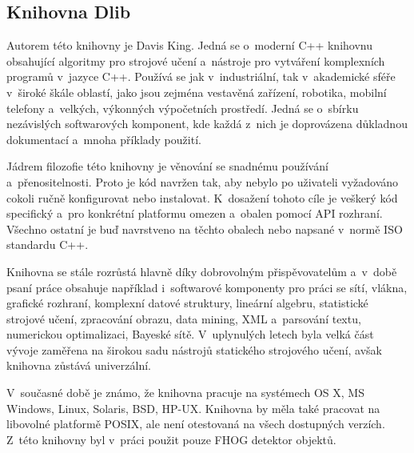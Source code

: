\subsection{Knihovna Dlib}
Autorem této knihovny je Davis King. Jedná se o~moderní C++ knihovnu obsahující algoritmy pro strojové učení a~nástroje pro vytváření komplexních programů v~jazyce C++. Používá se jak v~industriální, tak v~akademické sféře v~široké škále oblastí, jako jsou zejména vestavěná zařízení, robotika, mobilní telefony a~velkých, výkonných výpočetních prostředí. Jedná se o~sbírku nezávislých softwarových komponent, kde každá z~nich je doprovázena důkladnou dokumentací a~mnoha příklady použití.

Jádrem filozofie této knihovny je věnování se snadnému používání a~přenositelnosti. Proto je kód navržen tak, aby nebylo po uživateli vyžadováno cokoli ručně konfigurovat nebo instalovat. K~dosažení tohoto cíle je veškerý kód specifický a~pro konkrétní platformu omezen a~obalen pomocí API rozhraní. Všechno ostatní je buď navrstveno na těchto obalech nebo napsané v~normě ISO standardu C++. 

Knihovna se stále rozrůstá hlavně díky dobrovolným přispěvovatelům a~v~době psaní práce obsahuje například i~softwarové komponenty pro práci se sítí, vlákna, grafické rozhraní, komplexní datové struktury, lineární algebru, statistické strojové učení, zpracování obrazu, data mining, XML a~parsování textu, numerickou optimalizaci, Bayeské sítě. V~uplynulých letech byla velká část vývoje zaměřena na širokou sadu nástrojů statického strojového učení, avšak knihovna zůstává univerzální.  

V~současné době je známo, že knihovna pracuje na systémech OS X, MS Windows, Linux, Solaris, BSD, HP-UX. Knihovna by měla také pracovat na libovolné platformě POSIX, ale není otestovaná na všech dostupných verzích. 
Z~této knihovny byl v~práci použit pouze FHOG detektor objektů.


